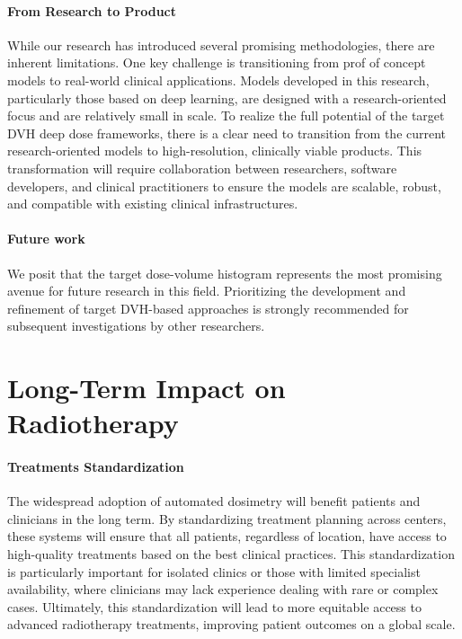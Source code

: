 \paragraph{From Research to Product}
While our research has introduced several promising methodologies, there are inherent limitations.
One key challenge is transitioning from prof of concept models to real-world clinical applications.
Models developed in this research, particularly those based on deep learning, are designed with a research-oriented focus and are relatively small in scale.
To realize the full potential of the target DVH deep dose frameworks, there is a clear need to transition from the current research-oriented models to high-resolution, clinically viable products.
This transformation will require collaboration between researchers, software developers, and clinical practitioners to ensure the models are scalable, robust, and compatible with existing clinical infrastructures.

\paragraph{Future work}
We posit that the target dose-volume histogram represents the most promising avenue for future research in this field.
Prioritizing the development and refinement of target DVH-based approaches is strongly recommended for subsequent investigations by other researchers.

\section{Long-Term Impact on Radiotherapy}
\paragraph{Treatments Standardization}
The widespread adoption of automated dosimetry will benefit patients and clinicians in the long term.
By standardizing treatment planning across centers, these systems will ensure that all patients, regardless of location, have access to high-quality treatments based on the best clinical practices.
This standardization is particularly important for isolated clinics or those with limited specialist availability, where clinicians may lack experience dealing with rare or complex cases.
Ultimately, this standardization will lead to more equitable access to advanced radiotherapy treatments, improving patient outcomes on a global scale.

